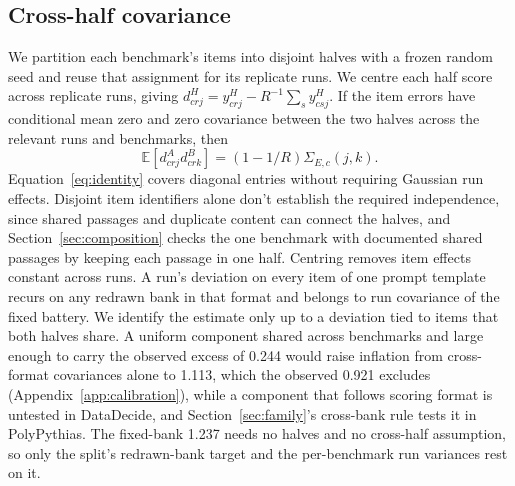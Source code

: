 \subsection{Cross-half covariance}
We partition each benchmark's items into disjoint halves with a frozen random seed and reuse that assignment for its replicate runs. We centre each half score across replicate runs, giving $d^H_{crj}=y^H_{crj}-R^{-1}\sum_s y^H_{csj}$. If the item errors have conditional mean zero and zero covariance between the two halves across the relevant runs and benchmarks, then
\begin{equation}
\mathbb{E}[d^A_{crj}d^B_{crk}]=(1-1/R)\Sigma_{E,c}(j,k).
\label{eq:identity}
\end{equation}
Equation~\ref{eq:identity} covers diagonal entries without requiring Gaussian run effects. Disjoint item identifiers alone don't establish the required independence, since shared passages and duplicate content can connect the halves, and Section~\ref{sec:composition} checks the one benchmark with documented shared passages by keeping each passage in one half. Centring removes item effects constant across runs. A run's deviation on every item of one prompt template recurs on any redrawn bank in that format and belongs to run covariance of the fixed battery. We identify the estimate only up to a deviation tied to items that both halves share. A uniform component shared across benchmarks and large enough to carry the observed excess of 0.244 would raise inflation from cross-format covariances alone to 1.113, which the observed 0.921  excludes (Appendix~\ref{app:calibration}), while a component that follows scoring format is untested in DataDecide, and Section~\ref{sec:family}'s cross-bank rule tests it in PolyPythias. The fixed-bank 1.237 needs no halves and no cross-half assumption, so only the split's redrawn-bank target and the per-benchmark run variances rest on it.

